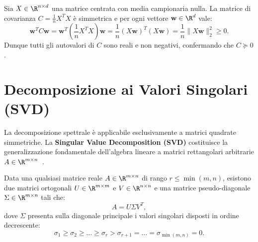 \begin{example}
Sia $X \in \R^{n \times d}$ una matrice centrata con media campionaria nulla. La matrice di covarianza $C = \frac{1}{n} X^T X$ è simmetrica e per ogni vettore $\mathbf{w} \in \R^d$ vale:
\begin{equation}
    \mathbf{w}^T C \mathbf{w} = \mathbf{w}^T \left(\frac{1}{n} X^T X\right) \mathbf{w} = \frac{1}{n} (X \mathbf{w})^T (X \mathbf{w}) = \frac{1}{n} \|X \mathbf{w}\|_2^2 \ge 0.
\end{equation}
Dunque tutti gli autovalori di $C$ sono reali e non negativi, confermando che $C \succeq 0$.
\end{example}

\FloatBarrier
\section{Decomposizione ai Valori Singolari (SVD)}
\label{sec:svd}

La decomposizione spettrale è applicabile esclusivamente a matrici quadrate simmetriche. La \textbf{Singular Value Decomposition (SVD)} costituisce la generalizzazione fondamentale dell'algebra lineare a matrici rettangolari arbitrarie $A \in \R^{m \times n}$~\cite{golub2013matrix,strang2019linear}.

\begin{theorem}
Data una qualsiasi matrice reale $A \in \R^{m \times n}$ di rango $r \le \min(m, n)$, esistono due matrici ortogonali $U \in \R^{m \times m}$ e $V \in \R^{n \times n}$ e una matrice pseudo-diagonale $\Sigma \in \R^{m \times n}$ tali che:
\begin{equation}
    A = U \Sigma V^T,
\end{equation}
dove $\Sigma$ presenta sulla diagonale principale i valori singolari disposti in ordine decrescente:
\begin{equation}
    \sigma_1 \ge \sigma_2 \ge \dots \ge \sigma_r > \sigma_{r+1} = \dots = \sigma_{\min(m, n)} = 0.
\end{equation}
\end{theorem}

